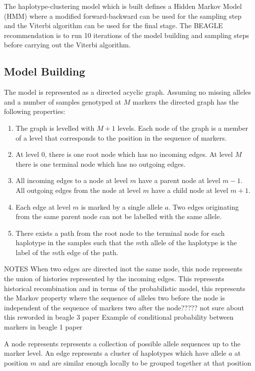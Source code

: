 \documentclass[a4paper,12pt,twoside,abstraction,titlepage]{article}
\begin{document}
The haplotype-clustering model which is built defines a Hidden Markov Model (HMM) where a modified forward-backward can be used for the sampling step and the Viterbi algorithm can be used for the final stage.  The BEAGLE recommendation is to run 10 iterations of the model building and sampling steps before carrying out the Viterbi algorithm.


\newpage
\subsection{Model Building}
The model is represented as a directed acyclic graph.  Assuming no missing alleles and a number of samples genotyped at $M$ markers the directed graph has the following properties:

\vspace{-5pt}
\begin{enumerate}
\itemsep0pt
\item The graph is levelled with $M+1$ levels. Each node of the graph is a member of a level that corresponds to the position in the sequence of markers.
\item At level $0$, there is one root node which has no incoming edges.  At level $M$ there is one terminal node which has no outgoing edges.
\item All incoming edges to a node at level $m$ have a parent node at level $m-1$.  All outgoing edges from the node at level $m$ have a child node at level $m+1$.
\item Each edge at level $m$ is marked by a single allele $a$.  Two edges originating from the same parent node can not be labelled with the same allele.
\item There exists a path from the root node to the terminal node for each haplotype in the samples such that the $m$th allele of the haplotype is the label of the $m$th edge of the path.
\end{enumerate}


NOTES
When two edges are directed inot the same node, this node represents the union of histories represented by the incoming edges. This represents historical recombination and in terms of the probabilistic model, this represents the Markov property where the sequence of alleles two before the node is independent of the sequence of markers two after the node????? not sure about this reworded in beagle 3 paper
Example of conditional probability between markers in beagle 1 paper

A node represents represents a collection of possible allele sequences up to the marker level.
An edge represents a cluster of haplotypes which have allele $a$ at position $m$ and are similar enough locally to be grouped together at that position
\end{document}
